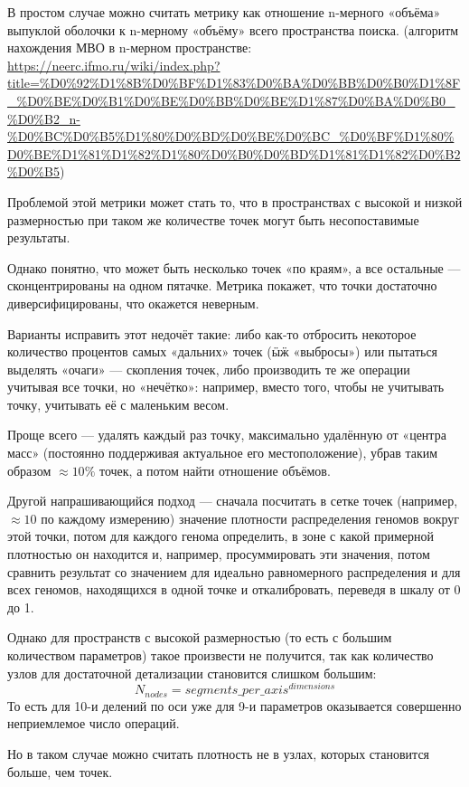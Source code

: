 В простом случае можно считать метрику как отношение n-мерного «объёма» выпуклой оболочки к n-мерному «объёму» всего пространства поиска.
(алгоритм нахождения МВО в n-мерном пространстве: \url{https://neerc.ifmo.ru/wiki/index.php?title=%D0%92%D1%8B%D0%BF%D1%83%D0%BA%D0%BB%D0%B0%D1%8F_%D0%BE%D0%B1%D0%BE%D0%BB%D0%BE%D1%87%D0%BA%D0%B0_%D0%B2_n-%D0%BC%D0%B5%D1%80%D0%BD%D0%BE%D0%BC_%D0%BF%D1%80%D0%BE%D1%81%D1%82%D1%80%D0%B0%D0%BD%D1%81%D1%82%D0%B2%D0%B5})

Проблемой этой метрики может стать то, что в пространствах с высокой и низкой  размерностью при таком же количестве точек могут быть несопоставимые результаты.

Однако понятно, что может быть несколько точек «по краям», а все остальные — сконцентрированы на одном пятачке.
Метрика покажет, что точки достаточно диверсифицированы, что окажется неверным.

Варианты исправить этот недочёт такие:
либо как-то отбросить некоторое количество процентов самых «дальних» точек (ӹӝ «выбросы») или пытаться выделять «очаги» — скопления точек,
либо производить те же операции учитывая все точки, но «нечётко»: например, вместо того, чтобы не учитывать точку, учитывать её с маленьким весом.

Проще всего — удалять каждый раз точку, максимально удалённую от «центра масс» (постоянно поддерживая актуальное его местоположение),
убрав таким образом $\approx 10\%$ точек, а потом найти отношение объёмов.

Другой напрашивающийся подход — сначала посчитать в сетке точек (например, $\approx 10$ по каждому измерению)
значение плотности распределения геномов вокруг этой точки, потом для каждого генома определить, в зоне с какой примерной плотностью он находится и, например, просуммировать эти значения,
потом сравнить результат со значением для идеально равномерного распределения и для всех геномов, находящихся в одной точке и откалибровать, переведя в шкалу от 0 до 1.

Однако для пространств с высокой размерностью (то есть с большим количеством параметров) такое произвести не получится, так как количество узлов
для достаточной детализации становится слишком большим:
\begin{equation}
    N_{nodes} = segments\_per\_axis^{dimensions}
\end{equation}
То есть для 10-и делений по оси уже для 9-и параметров оказывается совершенно неприемлемое число операций.

Но в таком случае можно считать плотность не в узлах, которых становится больше, чем точек.

